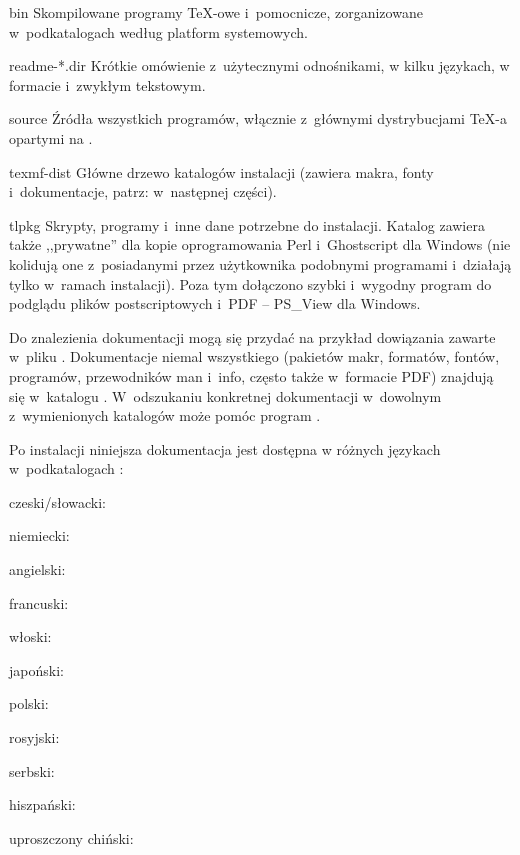 \documentclass{article}
\begin{document}
\begin{ttdescription}
\item[bin] Skompilowane programy \TeX-owe i~pomocnicze, zorganizowane
w~podkatalogach  według platform systemowych.

\item[readme-*.dir] Krótkie omówienie z~użytecznymi odnośnikami,
w kilku językach, w formacie \HTML{} i~zwykłym tekstowym.

\item[source] Źródła wszystkich programów, włącznie z~głównymi dystrybucjami
 \TeX-a opartymi na  \Webc{}.

\item[texmf-dist] Główne drzewo katalogów instalacji (zawiera makra,
 fonty i~dokumentacje, patrz:  w~następnej części).

\item[tlpkg] Skrypty, programy i~inne dane potrzebne do instalacji.
  Katalog zawiera także ,,prywatne'' dla \TL{} kopie oprogramowania Perl
  i~Ghostscript dla Windows (nie kolidują one z~posiadanymi przez użytkownika
  podobnymi programami i~działają tylko w~ramach instalacji). Poza tym
  dołączono szybki i~wygodny program do podglądu plików postscriptowych i~PDF
  -- PS\_View dla Windows.
\end{ttdescription}
 
Do znalezienia dokumentacji mogą się przydać na przykład dowiązania zawarte
w~pliku . Dokumentacje niemal wszystkiego (pakietów makr,
formatów, fontów, programów, przewodników man i~info, często także w~formacie
PDF) znajdują się w~katalogu . W~odszukaniu
konkretnej dokumentacji w~dowolnym z~wymienionych
katalogów może pomóc program .


Po instalacji niniejsza dokumentacja jest dostępna w różnych językach
w~podkatalogach :

\begin{itemize*}
\item{czeski/słowacki:} 
\item{niemiecki:} 
\item{angielski:} 
\item{francuski:} 
\item{włoski:} 
\item{japoński:} 
\item{polski:} 
\item{rosyjski:} 
\item{serbski:} 
\item{hiszpański:} 
\item{uproszczony chiński:} 
\end{itemize*}
  
\end{document}
